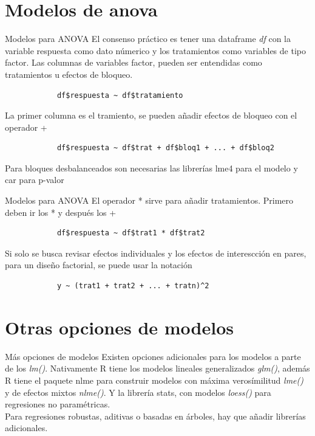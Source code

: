\documentclass[aspectratio=169,xcolor=dvipsnames]{beamer}
\begin{document}
\section{Modelos de anova}
    \begin{frame}[fragile]{Modelos para ANOVA}
        El consenso práctico es tener una dataframe \textit{df} con la variable respuesta como dato númerico
        y los tratamientos como variables de tipo factor. Las columnas de variables factor, pueden ser 
        entendidas como tratamientos u efectos de bloqueo.
        \begin{verbatim}
            df$respuesta ~ df$tratamiento
        \end{verbatim}
        La primer columna es el tramiento, se pueden añadir efectos de bloqueo con el operador +
        \begin{verbatim}
            df$respuesta ~ df$trat + df$bloq1 + ... + df$bloq2
        \end{verbatim}
        Para bloques desbalanceados son necesarias las librerías lme4 para el modelo y car para p-valor
    \end{frame}

    \begin{frame}[fragile]{Modelos para ANOVA}
        El operador * sirve para añadir tratamientos. Primero deben ir los * y después los +
        \begin{verbatim}
            df$respuesta ~ df$trat1 * df$trat2
        \end{verbatim}
        Si solo se busca revisar efectos individuales y los efectos de interescción en pares, para
        un diseño factorial, se puede usar la notación
        \begin{verbatim}
            y ~ (trat1 + trat2 + ... + tratn)^2
        \end{verbatim}
    \end{frame}

    \section{Otras opciones de modelos}
    \begin{frame}{Más opciones de modelos}
        Existen opciones adicionales para los modelos a parte de los \textit{lm()}. Nativamente
        R tiene los modelos lineales generalizados \textit{glm()}, además R tiene el paquete nlme
        para construir modelos con máxima verosímilitud \textit{lme()} y de efectos mixtos \textit{nlme()}.
        Y la librería stats, con modelos \textit{loess()} para regresiones no paramétricas.
        \\
        Para regresiones robustas, aditivas o basadas en árboles, hay que añadir librerías adicionales.
    \end{frame}
\end{document}
